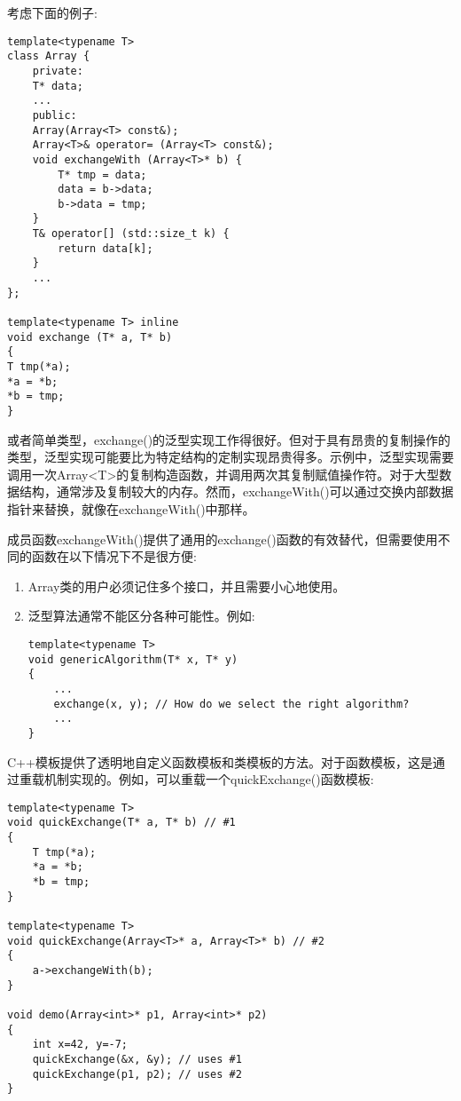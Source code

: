 
考虑下面的例子:

\begin{lstlisting}[style=styleCXX]
template<typename T>
class Array {
	private:
	T* data;
	...
	public:
	Array(Array<T> const&);
	Array<T>& operator= (Array<T> const&);
	void exchangeWith (Array<T>* b) {
		T* tmp = data;
		data = b->data;
		b->data = tmp;
	}
	T& operator[] (std::size_t k) {
		return data[k];
	}
	...
};

template<typename T> inline
void exchange (T* a, T* b)
{
T tmp(*a);
*a = *b;
*b = tmp;
}
\end{lstlisting}

或者简单类型，exchange()的泛型实现工作得很好。但对于具有昂贵的复制操作的类型，泛型实现可能要比为特定结构的定制实现昂贵得多。示例中，泛型实现需要调用一次Array<T>的复制构造函数，并调用两次其复制赋值操作符。对于大型数据结构，通常涉及复制较大的内存。然而，exchangeWith()可以通过交换内部数据指针来替换，就像在exchangeWith()中那样。



成员函数exchangeWith()提供了通用的exchange()函数的有效替代，但需要使用不同的函数在以下情况下不是很方便:

\begin{enumerate}
\item 
Array类的用户必须记住多个接口，并且需要小心地使用。

\item 
泛型算法通常不能区分各种可能性。例如:

\begin{lstlisting}[style=styleCXX]
template<typename T>
void genericAlgorithm(T* x, T* y)
{
	...
	exchange(x, y); // How do we select the right algorithm?
	...
}
\end{lstlisting}

\end{enumerate}

C++模板提供了透明地自定义函数模板和类模板的方法。对于函数模板，这是通过重载机制实现的。例如，可以重载一个quickExchange()函数模板:

\begin{lstlisting}[style=styleCXX]
template<typename T>
void quickExchange(T* a, T* b) // #1
{
	T tmp(*a);
	*a = *b;
	*b = tmp;
}

template<typename T>
void quickExchange(Array<T>* a, Array<T>* b) // #2
{
	a->exchangeWith(b);
}

void demo(Array<int>* p1, Array<int>* p2)
{
	int x=42, y=-7;
	quickExchange(&x, &y); // uses #1
	quickExchange(p1, p2); // uses #2
}
\end{lstlisting}

